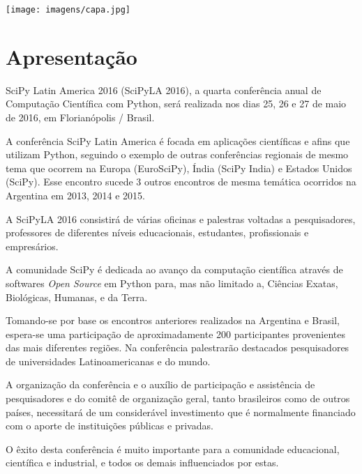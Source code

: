 \documentclass[report,a4paper,twocolumn]{memoir}
\begin{document}
\thispagestyle{empty}
\onecolumn
\begin{center}
  \texttt{[image: imagens/capa.jpg]}
\end{center}
\twocolumn

\clearpage

\restoregeometry
\pagestyle{plain} %
\setcounter{page}{2}
\tableofcontents

\chapter*{Apresentação}

SciPy Latin America 2016 (SciPyLA 2016), a quarta conferência anual de Computação Científica com Python, será realizada nos dias 25, 26 e 27 de maio de 2016, em Florianópolis / Brasil.

A conferência SciPy Latin America é focada em aplicações científicas e afins que
utilizam Python, seguindo o exemplo de outras conferências regionais de mesmo tema que ocorrem na Europa (EuroSciPy), Índia (SciPy India) e Estados Unidos (SciPy). Esse encontro sucede 3 outros encontros de mesma temática ocorridos na Argentina em 2013, 2014 e 2015.

A SciPyLA 2016 consistirá de várias oficinas e palestras voltadas a pesquisadores, professores de diferentes níveis educacionais, estudantes, profissionais e empresários.

A comunidade SciPy é dedicada ao avanço da computação científica através de softwares \emph{Open Source} em Python para, mas não limitado a, Ciências Exatas, Biológicas, Humanas, e da Terra.

Tomando-se por base os encontros anteriores realizados na Argentina e Brasil, espera-se uma participação de aproximadamente 200 participantes provenientes das mais diferentes regiões. Na conferência palestrarão destacados pesquisadores de universidades Latinoamericanas e do mundo.

A organização da conferência e o auxílio de participação e assistência de pesquisadores e do comitê de organização geral, tanto brasileiros como de outros países,
necessitará de
%
um considerável investimento que é normalmente financiado com o aporte de instituições públicas e privadas.

O êxito desta conferência é muito importante para a comunidade educacional, científica e industrial, e todos os demais influenciados por estas.
\end{document}
